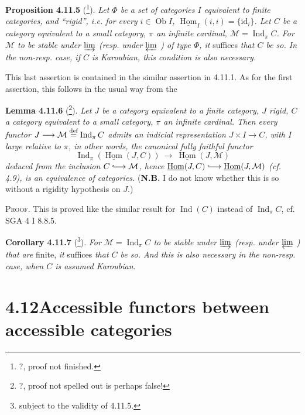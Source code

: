 \documentclass[11pt]{article}
\newcommand{\printedpage}[1]{\marginpar{\footnotesize p.~#1}}
\newcommand{\msp}[1]{\marginpar{\footnotesize [#1]}}
\newcommand{\defeq}{\overset{\text{\upshape def}}{=}}
\newcommand{\Hom}{\underline{\operatorname{Hom}}}
\newcommand{\Ind}{\operatorname{Ind}}
\newcommand{\into}{\lhook\joinrel\longrightarrow}
\begin{document}
\textbf{Proposition 4.11.5} (\footnote{?, proof not finished.}). \textit{Let $\Phi$ be a set of categories $I$ equivalent to finite categories, and ``rigid'', i.e. for every $i \in \operatorname{Ob} I$, $\Hom_I(i,i) = \{\mathrm{id}_i\}$. Let $C$ be a category equivalent to a small category, $\pi$ an infinite cardinal, $\mathcal{M} = \Ind_\pi C$. For $\mathcal{M}$ to be stable under $\varinjlim$ (resp. under $\varprojlim$ ) of type $\Phi$, it} suffices \textit{that $C$ be so. In the non-resp. case, if $C$ is Karoubian, this condition is also necessary.}

This last assertion is contained in the similar assertion in 4.11.1. As for the first assertion, this follows in the usual way from the

\textbf{Lemma 4.11.6} (\footnote{?, proof not spelled out is perhaps false!}). \textit{Let $J$ be a category equivalent to a finite category, $J$ rigid, $C$ a category equivalent to a small category, $\pi$ an infinite cardinal. Then every functor}
\printedpage{102}
\textit{$J \longrightarrow \mathcal{M} \defeq \Ind_\pi C$ admits an indicial representation $J \times I \longrightarrow C$, with $I$ large relative to $\pi$, in other words, the} \msp{page 272} \textit{canonical fully faithful functor}
\[
\Ind_\pi(\Hom(J,C)) \ \longrightarrow \ \Hom(J,\mathcal{M})
\]
\textit{deduced from the inclusion $C \into \mathcal{M}$, hence $\Hom(J,C) \into \Hom(J,\mathcal{M})$ (cf. 4.9), is an equivalence of categories.} (\textbf{N.B.} I do not know whether this is so without a rigidity hypothesis on $J$.)

\textsc{Proof}. This is proved like the similar result for $\Ind(C)$ instead of $\Ind_\pi C$, cf. SGA 4 I 8.8.5.

\msp{page 273}

\textbf{Corollary 4.11.7} (\footnote{subject to the validity of 4.11.5.}). \textit{For $\mathcal{M} = \Ind_\pi C$ to be stable under $\varinjlim$ (resp. under $\varprojlim$ ) that are} finite, \textit{it} suffices \textit{that $C$ be so. And this is also necessary in the non-resp. case, when $C$ is assumed Karoubian.}

\section*{4.12\quad Accessible functors between accessible categories}
\end{document}
